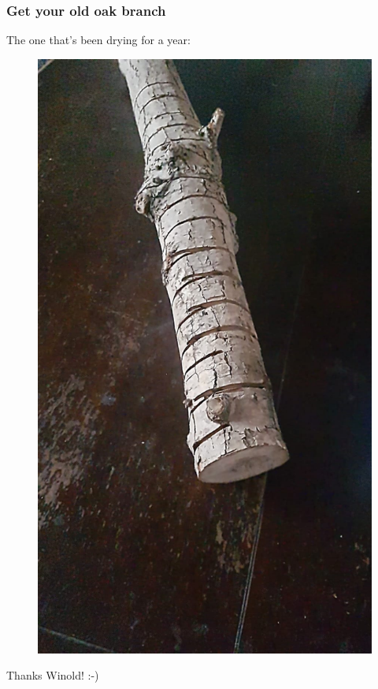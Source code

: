 \documentclass{beamer}
\begin{document}
\begin{frame}
\frametitle{Get your old oak branch}
The one that's been drying for a year:
\begin{figure}
\includegraphics[height=.6\textheight]{images/oak-branch.jpeg}
\end{figure}
Thanks Winold! :-)
\end{frame}
\end{document}
